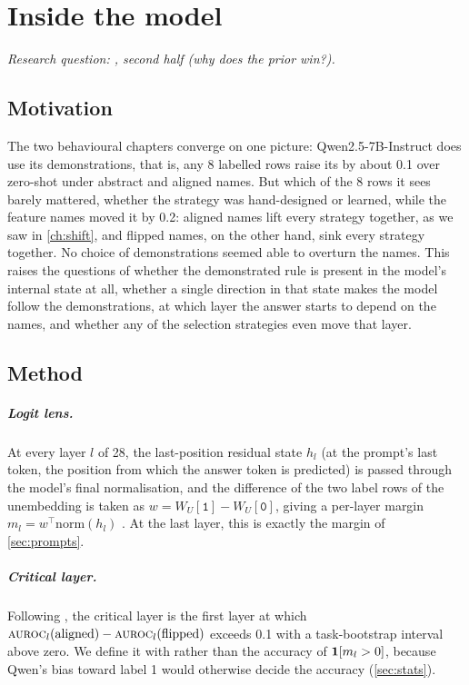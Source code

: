 \chapter{Inside the model}
\label{ch:mechanism}

\emph{Research question: , second half (why does the prior win?).}

\section{Motivation}

The two behavioural chapters converge on one picture: Qwen2.5-7B-Instruct does use its demonstrations, that is, any 8 labelled rows raise its \AUROC by about 0.1 over zero-shot under abstract and aligned names. But which of the 8 rows it sees barely mattered, whether the strategy was hand-designed or learned, while the feature names moved it by 0.2: aligned names lift every strategy together, as we saw in \autoref{ch:shift}, and flipped names, on the other hand, sink every strategy together. No choice of demonstrations seemed able to overturn the names. This raises the questions of whether the demonstrated rule is present in the model's internal state at all, whether a single direction in that state makes the model follow the demonstrations, at which layer the answer starts to depend on the names, and whether any of the selection strategies even move that layer.

\section{Method}
\paragraph{Logit lens.}

At every layer $l$ of 28, the last-position residual state $h_l$ (at the prompt's last token, the position from which the answer token is predicted) is passed through the model's final normalisation, and the difference of the two label rows of the unembedding is taken as $w = W_U[\texttt{1}] - W_U[\texttt{0}]$, giving a per-layer margin $m_l = w^\top \mathrm{norm}(h_l)$ \citep{nostalgebraist2020logit,elhage2021mathematical}. At the last layer, this is exactly the margin of \autoref{sec:prompts}.

\paragraph{Critical layer.}
Following \citet{halawi2024overthinking}, the critical layer is the first layer at which $\textsc{auroc}_l(\text{aligned}) - \textsc{auroc}_l(\text{flipped})$ exceeds 0.1 with a task-bootstrap interval above zero.
We define it with \AUROC rather than the accuracy of $\mathbf{1}[m_l > 0]$, because Qwen's bias toward label 1 would otherwise decide the accuracy (\autoref{sec:stats}).

